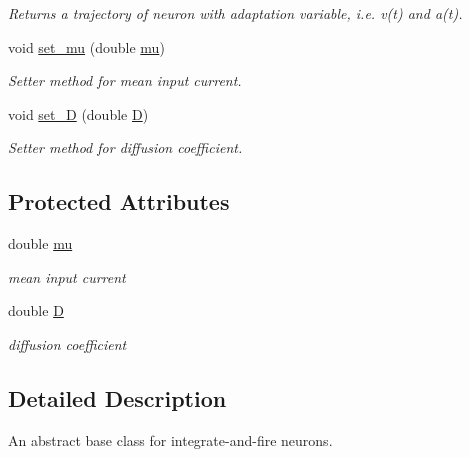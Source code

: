 \begin{DoxyCompactItemize}
\begin{DoxyCompactList}\small\item\em Returns a trajectory of neuron with adaptation variable, i.\+e. v(t) and a(t). \end{DoxyCompactList}\item 
void \hyperlink{classIF_a4ca244c0e1095a3014af3cdbf225ded1}{set\+\_\+mu} (double \hyperlink{classIF_a9f690c993d7b7cd0095e26607503db72}{mu})
\begin{DoxyCompactList}\small\item\em Setter method for mean input current. \end{DoxyCompactList}\item 
void \hyperlink{classIF_a886eef4d18be5cc81e96ff46c1e0037b}{set\+\_\+D} (double \hyperlink{classIF_a7e0fdbf32975dba0acf8096524885639}{D})
\begin{DoxyCompactList}\small\item\em Setter method for diffusion coefficient. \end{DoxyCompactList}\end{DoxyCompactItemize}
\subsection*{Protected Attributes}
\begin{DoxyCompactItemize}
\item 
\mbox{\label{classIF_a9f690c993d7b7cd0095e26607503db72}} 
double \hyperlink{classIF_a9f690c993d7b7cd0095e26607503db72}{mu}
\begin{DoxyCompactList}\small\item\em mean input current \end{DoxyCompactList}\item 
\mbox{\label{classIF_a7e0fdbf32975dba0acf8096524885639}} 
double \hyperlink{classIF_a7e0fdbf32975dba0acf8096524885639}{D}
\begin{DoxyCompactList}\small\item\em diffusion coefficient \end{DoxyCompactList}\end{DoxyCompactItemize}


\subsection{Detailed Description}
An abstract base class for integrate-\/and-\/fire neurons. 

